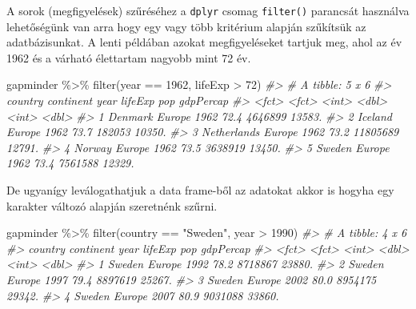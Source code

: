 \documentclass[
]{book}
\newenvironment{Shaded}{\begin{snugshade}}{\end{snugshade}}
\newcommand{\CommentTok}[1]{\textcolor[rgb]{0.56,0.35,0.01}{\textit{#1}}}
\newcommand{\DecValTok}[1]{\textcolor[rgb]{0.00,0.00,0.81}{#1}}
\newcommand{\FunctionTok}[1]{\textcolor[rgb]{0.00,0.00,0.00}{#1}}
\newcommand{\NormalTok}[1]{#1}
\newcommand{\SpecialCharTok}[1]{\textcolor[rgb]{0.00,0.00,0.00}{#1}}
\newcommand{\StringTok}[1]{\textcolor[rgb]{0.31,0.60,0.02}{#1}}
\begin{document}
A sorok (megfigyelések) szűréséhez a \texttt{dplyr} csomag
\texttt{filter()} parancsát használva lehetőségünk van arra hogy egy
vagy több kritérium alapján szűkítsük az adatbázisunkat. A lenti
példában azokat megfigyeléseket tartjuk meg, ahol az év 1962 és a
várható élettartam nagyobb mint 72 év.

\begin{Shaded}
\begin{Highlighting}[]
\NormalTok{gapminder }\SpecialCharTok{\%\textgreater{}\%}
  \FunctionTok{filter}\NormalTok{(year }\SpecialCharTok{==} \DecValTok{1962}\NormalTok{, lifeExp }\SpecialCharTok{\textgreater{}} \DecValTok{72}\NormalTok{)}
\CommentTok{\#\textgreater{} \# A tibble: 5 x 6}
\CommentTok{\#\textgreater{}   country     continent  year lifeExp      pop gdpPercap}
\CommentTok{\#\textgreater{}   \textless{}fct\textgreater{}       \textless{}fct\textgreater{}     \textless{}int\textgreater{}   \textless{}dbl\textgreater{}    \textless{}int\textgreater{}     \textless{}dbl\textgreater{}}
\CommentTok{\#\textgreater{} 1 Denmark     Europe     1962    72.4  4646899    13583.}
\CommentTok{\#\textgreater{} 2 Iceland     Europe     1962    73.7   182053    10350.}
\CommentTok{\#\textgreater{} 3 Netherlands Europe     1962    73.2 11805689    12791.}
\CommentTok{\#\textgreater{} 4 Norway      Europe     1962    73.5  3638919    13450.}
\CommentTok{\#\textgreater{} 5 Sweden      Europe     1962    73.4  7561588    12329.}
\end{Highlighting}
\end{Shaded}

De ugyanígy leválogathatjuk a data frame-ből az adatokat akkor is hogyha
egy karakter változó alapján szeretnénk szűrni.

\begin{Shaded}
\begin{Highlighting}[]
\NormalTok{gapminder }\SpecialCharTok{\%\textgreater{}\%}
  \FunctionTok{filter}\NormalTok{(country }\SpecialCharTok{==} \StringTok{"Sweden"}\NormalTok{, year }\SpecialCharTok{\textgreater{}} \DecValTok{1990}\NormalTok{)}
\CommentTok{\#\textgreater{} \# A tibble: 4 x 6}
\CommentTok{\#\textgreater{}   country continent  year lifeExp     pop gdpPercap}
\CommentTok{\#\textgreater{}   \textless{}fct\textgreater{}   \textless{}fct\textgreater{}     \textless{}int\textgreater{}   \textless{}dbl\textgreater{}   \textless{}int\textgreater{}     \textless{}dbl\textgreater{}}
\CommentTok{\#\textgreater{} 1 Sweden  Europe     1992    78.2 8718867    23880.}
\CommentTok{\#\textgreater{} 2 Sweden  Europe     1997    79.4 8897619    25267.}
\CommentTok{\#\textgreater{} 3 Sweden  Europe     2002    80.0 8954175    29342.}
\CommentTok{\#\textgreater{} 4 Sweden  Europe     2007    80.9 9031088    33860.}
\end{Highlighting}
\end{Shaded}
\end{document}
